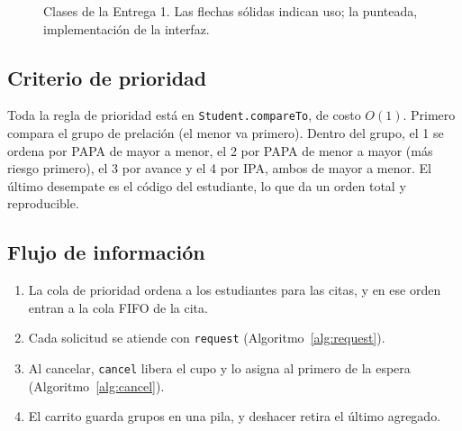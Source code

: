 \documentclass[conference]{IEEEtran}
\begin{document}
\begin{figure}[htbp]
\centering
\footnotesize
{}
\caption{Clases de la Entrega 1. Las flechas sólidas indican uso; la punteada, implementación de la interfaz.}
\label{fig:clases}
\end{figure}

\subsection{Criterio de prioridad}
Toda la regla de prioridad está en \texttt{Student.compareTo}, de costo $O(1)$. Primero compara el grupo de prelación (el menor va primero). Dentro del grupo, el 1 se ordena por PAPA de mayor a menor, el 2 por PAPA de menor a mayor (más riesgo primero), el 3 por avance y el 4 por IPA, ambos de mayor a menor. El último desempate es el código del estudiante, lo que da un orden total y reproducible.

\subsection{Flujo de información}
\begin{enumerate}
    \item La cola de prioridad ordena a los estudiantes para las citas, y en ese orden entran a la cola FIFO de la cita.
    \item Cada solicitud se atiende con \texttt{request} (Algoritmo~\ref{alg:request}).
    \item Al cancelar, \texttt{cancel} libera el cupo y lo asigna al primero de la espera (Algoritmo~\ref{alg:cancel}).
    \item El carrito guarda grupos en una pila, y deshacer retira el último agregado.
\end{enumerate}
\end{document}

